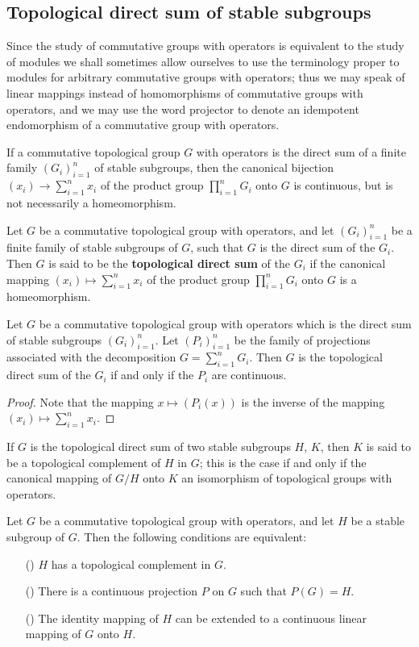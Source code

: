 \subsection{Topological direct sum of stable subgroups}
Since the study of commutative groups with operators is equivalent to the study of modules we shall sometimes allow ourselves to use the terminology proper to modules for arbitrary commutative groups with operators; thus we may speak of linear mappings instead of homomorphisms of commutative groups with operators, and we may use the word projector to denote an idempotent endomorphism of a commutative group with operators.\par
If a commutative topological group $G$ with operators is the direct sum of a finite family $(G_i)_{i=1}^{n}$ of stable subgroups, then the canonical bijection $(x_i)\to\sum_{i=1}^{n}x_i$ of the product group $\prod_{i=1}^{n}G_i$ onto $G$ is continuous, but is not necessarily a homeomorphism.
\begin{definition}
Let $G$ be a commutative topological group with operators, and let $(G_i)_{i=1}^{n}$ be a finite family of stable subgroups of $G$, such that $G$ is the direct sum of the $G_i$. Then $G$ is said to be the \textbf{topological direct sum} of the $G_i$ if the canonical mapping $(x_i)\mapsto\sum_{i=1}^{n}x_i$ of the product group $\prod_{i=1}^{n}G_i$ onto $G$ is a homeomorphism.
\end{definition}
\begin{proposition}\label{topological group operator direct sum iff}
Let $G$ be a commutative topological group with operators which is the direct sum of stable subgroups $(G_i)_{i=1}^{n}$. Let $(P_i)_{i=1}^{n}$ be the family of projections associated with the decomposition $G=\sum_{i=1}^{n}G_i$. Then $G$ is the topological direct sum of the $G_i$ if and only if the $P_i$ are continuous.
\end{proposition}
\begin{proof}
Note that the mapping $x\mapsto (P_i(x))$ is the inverse of the mapping $(x_i)\mapsto\sum_{i=1}^{n}x_i$.
\end{proof}
If $G$ is the topological direct sum of two stable subgroups $H$, $K$, then $K$ is said to be a topological complement of $H$ in $G$; this is the case if and only if the canonical mapping of $G/H$ onto $K$ an isomorphism of topological groups with operators.
\begin{corollary}\label{topological group complemented iff}
Let $G$ be a commutative topological group with operators, and let $H$ be a stable subgroup of $G$. Then the following conditions are equivalent:
\begin{itemize}
\item[(\rmnum{1})] $H$ has a topological complement in $G$.
\item[(\rmnum{2})] There is a continuous projection $P$ on $G$ such that $P(G)=H$.
\item[(\rmnum{3})] The identity mapping of $H$ can be extended to a continuous linear mapping of $G$ onto $H$.  
\end{itemize}
\end{corollary}
